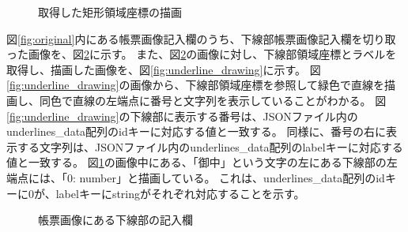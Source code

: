 \begin{figure}[t]
    \begin{center}
        \caption{取得した矩形領域座標の描画}
        \label{fig:rect_drawing}
    \end{center}
\end{figure}

図\ref{fig:original}内にある帳票画像記入欄のうち、下線部帳票画像記入欄を切り取った画像を、図\ref{fig:underline_original}に示す。
また、図\ref{fig:underline_original}の画像に対し、下線部領域座標とラベルを取得し、描画した画像を、図\ref{fig:underline_drawing}に示す。
図\ref{fig:underline_drawing}の画像から、下線部領域座標を参照して緑色で直線を描画し、同色で直線の左端点に番号と文字列を表示していることがわかる。
図\ref{fig:underline_drawing}の下線部に表示する番号は、JSONファイル内のunderlines\_data配列のidキーに対応する値と一致する。
同様に、番号の右に表示する文字列は、JSONファイル内のunderlines\_data配列のlabelキーに対応する値と一致する。
図\ref{fig:rect_drawing}の画像中にある、「御中」という文字の左にある下線部の左端点には、「0: number」と描画している。
これは、underlines\_data配列のidキーに0が、labelキーにstringがそれぞれ対応することを示す。

\begin{figure}[t]
    \begin{center}
        \caption{帳票画像にある下線部の記入欄}
        \label{fig:underline_original}
    \end{center}
\end{figure}


